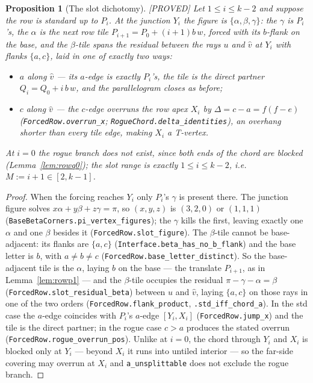 \documentclass[11pt,reqno]{amsart}
\theoremstyle{plain}
\newtheorem{proposition}[theorem]{Proposition}
\theoremstyle{definition}
\newcommand{\lab}[1]{\hfill\textnormal{\footnotesize\textsc{[#1]}}}
\begin{document}
\begin{proposition}[The slot dichotomy]\label{prop:slotdichotomy}\lab{PROVED}
Let $1\le i\le k-2$ and suppose the row is standard up to $P_i$. At the junction $Y_i$ the figure
is $\{\alpha,\beta,\gamma\}$: the $\gamma$ is $P_i$'s, the $\alpha$ is the next row tile
$P_{i+1}=P_0+(i+1)b\,w$, forced with its $b$-flank on the base, and the $\beta$-tile spans the
residual between the rays $u$ and $\hat v$ at $Y_i$ with flanks $\{a,c\}$, laid in one of exactly
two ways:
\begin{itemize}
\item[\textup{(std)}] $a$ along $\hat v$ --- its $a$-edge is exactly $P_i$'s, the tile is the
direct partner $Q_i=Q_0+i\,b\,w$, and the parallelogram closes as before;
\item[\textup{(rogue)}] $c$ along $\hat v$ --- the $c$-edge overruns the row apex $X_i$ by
$\Delta=c-a=f(f-e)$ \textup{(\texttt{ForcedRow.overrun\_x};
\texttt{RogueChord.delta\_identities})}, an overhang shorter than every tile edge, making $X_i$ a
T-vertex.
\end{itemize}
At $i=0$ the rogue branch does not exist, since both ends of the chord are blocked
(Lemma~\ref{lem:rowq0}); the slot range is exactly $1\le i\le k-2$, i.e.\ $M:=i+1\in[2,k-1]$.
\end{proposition}

\begin{proof}
When the forcing reaches $Y_i$ only $P_i$'s $\gamma$ is present there. The junction figure solves
$x\alpha+y\beta+z\gamma=\pi$, so $(x,y,z)$ is $(3,2,0)$ or $(1,1,1)$
\textup{(\texttt{BaseBetaCorners.pi\_vertex\_figures})}; the $\gamma$ kills the first, leaving
exactly one $\alpha$ and one $\beta$ besides it \textup{(\texttt{ForcedRow.slot\_figure})}. The
$\beta$-tile cannot be base-adjacent: its flanks are $\{a,c\}$
\textup{(\texttt{Interface.beta\_has\_no\_b\_flank})} and the base letter is $b$, with
$a\neq b\neq c$ \textup{(\texttt{ForcedRow.base\_letter\_distinct})}. So the base-adjacent tile
is the $\alpha$, laying $b$ on the base --- the translate $P_{i+1}$, as in
Lemma~\ref{lem:rowp1} --- and the $\beta$-tile occupies the residual
$\pi-\gamma-\alpha=\beta$ \textup{(\texttt{ForcedRow.slot\_residual\_beta})} between $u$ and
$\hat v$, laying $\{a,c\}$ on those rays in one of the two orders
\textup{(\texttt{ForcedRow.flank\_product}, \texttt{.std\_iff\_chord\_a})}. In the std case the
$a$-edge coincides with $P_i$'s $a$-edge $[Y_i,X_i]$ (\texttt{ForcedRow.jump\_x}) and the tile is
the direct partner; in the rogue case $c>a$ produces the stated overrun
\textup{(\texttt{ForcedRow.rogue\_overrun\_pos})}. Unlike at $i=0$, the chord through $Y_i$ and
$X_i$ is blocked only at $Y_i$ --- beyond $X_i$ it runs into untiled interior --- so the far-side
covering may overrun at $X_i$ and \texttt{a\_unsplittable} does not exclude the rogue branch.
\end{proof}
\end{document}
